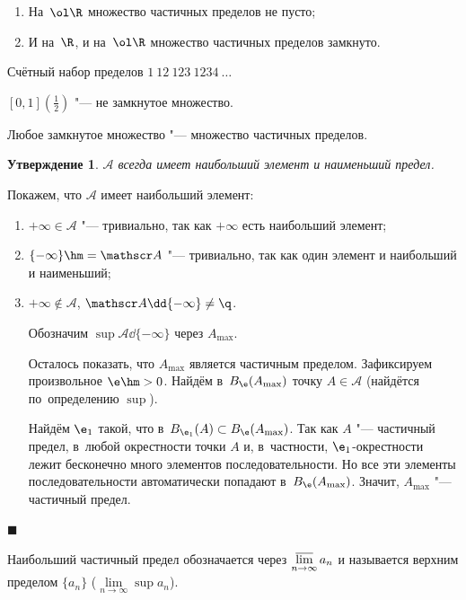 \documentclass[a4paper,10pt,twoside]{article}
\newtheorem{Ut}{Утверждение}[section]
\newenvironment{Proof}
       {\par\noindent{\textbf{Доказательство.}}}
       {\hfill$\scriptstyle\blacksquare$}
\begin{document}
\begin{enumerate}
\item На~$\ol\R$ множество частичных пределов не пусто;

\item И на~$\R$, и на~$\ol\R$ множество частичных пределов замкнуто.
\end{enumerate}

Счётный набор пределов $1\ 12\ 123\ 1234\ \ldots$

$[0,1]$\qquad $(\frac12)$ "--- не замкнутое множество.

Любое замкнутое множество "--- множество частичных пределов.

\begin{Ut}
$\mathscr A$ всегда имеет наибольший элемент и наименьший предел.
\end{Ut}

\begin{Proof}
Покажем, что $\mathscr A$ имеет наибольший элемент:

\begin{enumerate}
    \item $+\infty\in \mathscr A$ "--- тривиально, так как $+\infty$ есть наибольший элемент;

    \item $\{-\infty\}\hm=\mathscr A$ "--- тривиально, так как один элемент и наибольший и наименьший;

    \item $+\infty\nin \mathscr A$, $\mathscr A\dd\{-\infty\}\neq\q$.

        Обозначим $\sup\mathscr A\dd\{-\infty\}$ через $A_{\max}$.

        Осталось показать, что $A_{\max}$ является частичным пределом.
        Зафиксируем произвольное $\e\hm>0$.
        Найдём в~$B_\e(A_{\max})$ точку $A\in\mathscr A$
        (найдётся по~определению $\sup$).

        Найдём $\e_1$ такой, что в~$B_{\e_1}(A)\subset B_\e(A_{\max})$.
        Так как $A$ "--- частичный предел, в~любой окрестности  точки $A$ и, в~частности, $\e_1$-окрестности лежит бесконечно много элементов последовательности.
         Но все эти элементы последовательности автоматически попадают в~$B_\e(A_{\max})$.
         Значит, $A_{\max}$ "--- частичный предел.
\end{enumerate}
\end{Proof}

Наибольший частичный предел обозначается через $\varlimsup\limits_{n\to\infty}a_n$ и называется верхним пределом $\{a_n\}$ ($\lim\limits_{n\to\infty}\sup a_n$).
\end{document}
